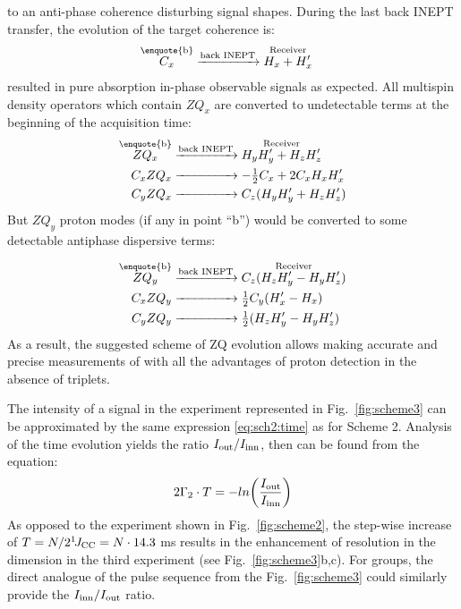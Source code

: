 \documentclass[twocolumn]{svjour3}           %
\begin{document}
to an anti-phase coherence 
disturbing signal shapes. During the last back INEPT transfer, the evolution of the target coherence is:
\begin{align}
\label{eq:term3:target}
   \overset{\text{\enquote{b}}}{C_x} & \xrightarrow{\text{back INEPT}} 
   \overset{\text{Receiver}}{H_x + H'_x}
\end{align}    
resulted in pure absorption in-phase observable signals as expected. All  
 multispin density operators which contain $ZQ_x$ are converted to undetectable terms at the beginning of the acquisition time:
\begin{subequations}
\label{eq:backZQx}
\begin{align}
   \label{eq:term3:zqx}
   \overset{\text{\enquote{b}}}{ZQ_x} & 
     \xrightarrow{\text{back INEPT}} 
     \overset{\text{Receiver}}{ H_y H'_y +  H_z H'_z} \\
   \label{eq:term3:cxzqx}
   {C_x ZQ_x} & \xrightarrow{\hphantom{\text{back INEPT}}} -\tfrac{1}{2}C_x + 2 C_x H_x H'_x \\
   \label{eq:term3:cyzqx}
   {C_y ZQ_x} & \xrightarrow{\hphantom{\text{back INEPT}}} C_z (H_y H'_y + H_z H'_z)
\end{align}
\end{subequations}
But $ZQ_y$ proton modes (if any in point \enquote{b}) would be converted to some detectable antiphase dispersive terms:

\begin{subequations}
\label{eq:backZQy}
\begin{align}
   \label{eq:term3:zqy}
     \overset{\text{\enquote{b}}}{ZQ_y} & \xrightarrow{\text{back INEPT}}
     \overset{\text{Receiver}}{C_z (H_z H'_y -  H_y H'_z )} \\
   \label{eq:term3:cxzqy}
   {C_x ZQ_y} & \xrightarrow{\hphantom{\text{back INEPT}}} \tfrac{1}{2}C_y ( H'_x- H_x ) \\
   \label{eq:term3:cyzqy}
   {C_y ZQ_y} & \xrightarrow{\hphantom{\text{back INEPT}}} \tfrac{1}{2}( H_z H'_y-  H_y H'_z )
\end{align}
\end{subequations}
As a result, the suggested scheme of 
ZQ evolution allows making accurate and precise measurements of 
\gtwoCH{} with all the advantages of proton detection in the absence 
of \clab{} triplets. 


The intensity of a signal in the experiment represented in 
Fig.~\ref{fig:scheme3} can be approximated by the same expression 
\eqref{eq:sch2:time} as for Scheme 2.
Analysis of the time evolution yields the ratio $I_\textrm{out}/I_\textrm{inn}$, then \gtwoCH{} can be found from the 
equation:
\begin{equation}
\label{eq:sch3:intensity}
 2 \Gamma_2 \cdot T = -ln \biggl(\frac{I_\textrm{out}}{I_\textrm{inn}} \biggr) 
\end{equation}
As opposed to the experiment shown in Fig.~\ref{fig:scheme2}, 
the step-wise increase of 
$T = N/2 ^1\!J_{\text{CC}} = N \cdot 14.3$ ms results in the enhancement of resolution 
in the \clab{} dimension in the third experiment (see 
Fig.~\ref{fig:scheme3}b,c). 
For \labNHtwo{} groups, the direct \nlab{} analogue of the pulse sequence
from the Fig.~\ref{fig:scheme3} could similarly provide the $I_\textrm{inn}/I_\textrm{out}$ ratio. 
\end{document}
